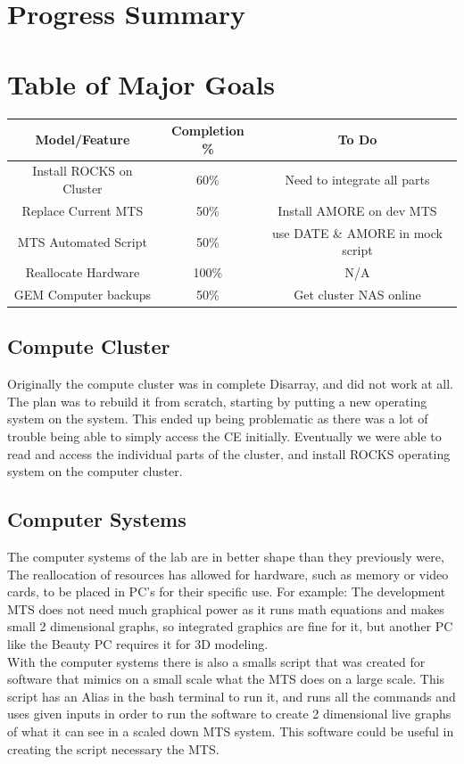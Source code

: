 \documentclass[12pt]{article}
\newcommand\tab[1][1cm]{\hspace*{#1}}
\begin{document}
\section{Progress Summary}

\section{Table of Major Goals}
\begin{tabular}{|c|c|c|}
	\hline
	Model/Feature & Completion \% & To Do \\
	\hline
	Install ROCKS on Cluster & 60\% & Need to integrate all parts \\
	\hline
	Replace Current MTS & 50\% & Install AMORE on dev MTS \\
	\hline
	MTS Automated Script & 50\% & use DATE \& AMORE in mock script \\
	\hline
	Reallocate Hardware & 100\% & N/A \\
	\hline
	GEM Computer backups & 50\% & Get cluster NAS online \\
	\hline
	
\end{tabular}
\subsection{Compute Cluster}
\tab Originally the compute cluster was in complete Disarray, and did not work at all. The plan was to rebuild it from scratch, starting by putting a new operating system on the system. This ended up being problematic as there was a lot of trouble being able to simply access the CE initially. Eventually we were able to read and access the individual parts of the cluster, and install ROCKS operating system on the computer cluster. 
\subsection{Computer Systems}
\tab The computer systems of the lab are in better shape than they previously were, The reallocation of resources has allowed for hardware, such as memory or video cards, to be placed in PC's for their specific use. For example: The development MTS does not need much graphical power as it runs math equations and makes small 2 dimensional graphs, so integrated graphics are fine for it, but another PC like the Beauty PC requires it for 3D modeling. \\
\tab With the computer systems there is also a smalls script that was created for software that mimics on a small scale what the MTS does on a large scale. This script has an Alias in the bash terminal to run it, and runs all the commands and uses given inputs in order to run the software to create 2 dimensional live graphs of what it can see in a scaled down MTS system. This software could be useful in creating the script necessary the MTS.
\end{document}
